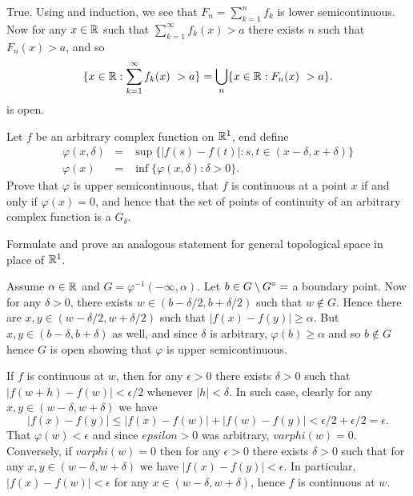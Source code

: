\begin{enumerate}
\begin{itemize}
 True.
 Using  and induction, we see that  \(F_n = \sum_{k=1}^n f_k\)
 is lower semicontinuous. Now for any \(x\in\mathbb{R}\) such that
 \(\sum_{k=1}^\infty f_k(x) > a\) there exists $n$ such that \(F_n(x) > a\),
 and so
 \begin{equation*}
  \{x\in\R: \sum_{k=1}^\infty f_k(x)\ > a\} =
  \bigcup_n \{x\in\R: F_n(x)\ > a\}.
 \end{equation*}
 is open.
\end{itemize}


\begin{excopy}
Let $f$ be an arbitrary complex function on \(\mathbb{R}^1\), end define
\begin{eqnarray*}
 \varphi(x,\delta) & = & \sup\{|f(s) - f(t)|: s,t\in (x-\delta, x+\delta)\}\\
 \varphi(x)        & = & \inf\{\varphi(x,\delta): \delta > 0\}.
\end{eqnarray*}
Prove that \(\varphi\) is upper semicontinuous, that $f$ is continuous
at a point $x$ if and only if \(\varphi(x)=0\), and hence that the set of
points of continuity of an arbitrary complex function is a \(G_\delta\).

Formulate and prove an analogous statement for general topological
space in place of \(\mathbb{R}^1\).
\end{excopy}

Assume \(\alpha \in \mathbb{R}\) and \(G=\varphi^{-1}(-\infty,\alpha)\).
Let \(b\in G\setminus G^{\circ} = \) a boundary point.
Now for any \(\delta>0\), there exists
\(w\in (b-\delta/2,b+\delta/2)\) such that \(w\notin G\).
Hence there are \(x,y\in(w-\delta/2,w+\delta/2)\) such that
\(|f(x)-f(y)| \geq \alpha\). But \(x,y\in (b-\delta,b+\delta)\) as well,
and since \(\delta\) is arbitrary, \(\varphi(b)\geq \alpha\) and
so \(b\notin G\) hence $G$ is open showing that \(\varphi\) is
upper semicontinuous.

If $f$ is continuous at $w$, then for any
\(\epsilon>0\) there exists \(\delta>0\) such that
\(|f(w+h)-f(w)| < \epsilon/2\) whenever \(|h|<\delta\).
In such case, clearly for any \(x,y\in (w-\delta,w+\delta)\)
we have
\begin{equation*}
|f(x) - f(y)| \leq
|f(x) - f(w)| + |f(w) - f(y)| < \epsilon/2 + \epsilon/2 = \epsilon.
\end{equation*}
That \(\varphi(w) < \epsilon\) and since \(epsilon>0\) was arbitrary,
\(varphi(w)=0\).
Conversely, if \(varphi(w)=0\) then for any \(\epsilon>0\)
there exists \(\delta>0\) such that for any \(x,y\in (w-\delta,w+\delta)\)
we have \(|f(x)-f(y)| < \epsilon\). In particular,
 \(|f(x)-f(w)| < \epsilon\) for any \(x \in (w-\delta,w+\delta)\),
hence $f$ is continuous at $w$.


\end{enumerate}
